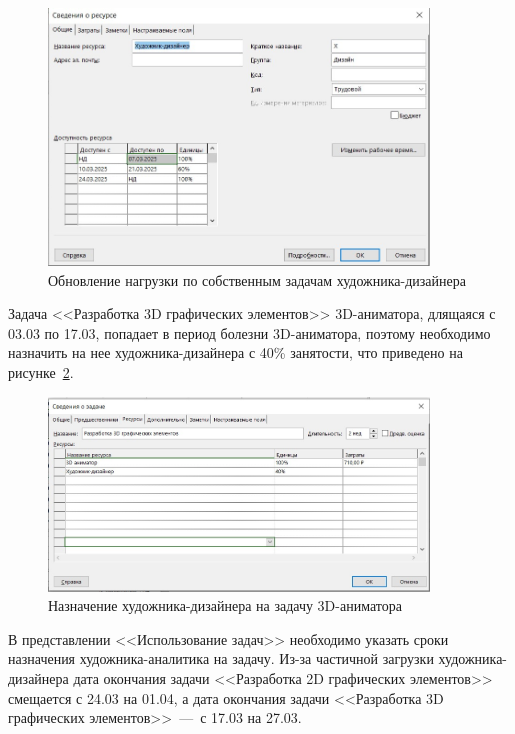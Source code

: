 \begin{figure}[H]
	\centering
	\includegraphics[width=0.9\textwidth]{img/screen4.jpg}
	\caption{Обновление нагрузки по собственным задачам художника-дизайнера}
	\label{fig:screen4}
\end{figure}

Задача <<Разработка 3D графических элементов>> 3D-аниматора, длящаяся с 03.03 по 17.03, попадает в период болезни 3D-аниматора, поэтому необходимо назначить на нее художника-дизайнера с 40\% занятости, что приведено на рисунке~\ref{fig:screen32}.

\begin{figure}[H]
	\centering
	\includegraphics[width=0.9\textwidth]{img/screen32.jpg}
	\caption{Назначение художника-дизайнера на задачу 3D-аниматора}
	\label{fig:screen32}
\end{figure}

В представлении <<Использование задач>> необходимо указать сроки назначения художника-аналитика на задачу.
Из-за частичной загрузки художника-дизайнера дата окончания задачи <<Разработка 2D графических элементов>> смещается с 24.03 на 01.04, а дата окончания задачи <<Разработка 3D графических элементов>>~---~с 17.03 на 27.03.

